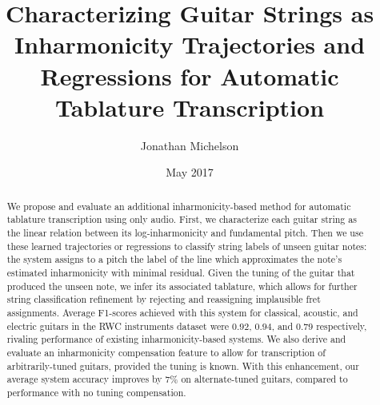\documentclass[12pt]{cmuthesis}
\begin{document}
 
\frontmatter

\pagestyle{empty}

\title{ %
{\bf Characterizing Guitar Strings as Inharmonicity Trajectories and Regressions for Automatic Tablature Transcription}}
\author{Jonathan Michelson}
\date{May 2017}
\trnumber{}


\support{}
\disclaimer{}



\maketitle


\pagestyle{plain} %


\begin{abstract}
We propose and evaluate an additional inharmonicity-based method for automatic tablature transcription using only audio. First, we characterize each guitar string as the linear relation between its log-inharmonicity and fundamental pitch. Then we use these learned trajectories or regressions to classify string labels of unseen guitar notes: the system assigns to a pitch the label of the line which approximates the note's estimated inharmonicity with minimal residual. Given the tuning of the guitar that produced the unseen note, we infer its associated tablature, which allows for further string classification refinement by rejecting and reassigning implausible fret assignments. Average F1-scores achieved with this system for classical, acoustic, and electric guitars in the RWC instruments dataset were $0.92$, $0.94$, and $0.79$ respectively, rivaling performance of existing inharmonicity-based systems. We also derive and evaluate an inharmonicity compensation feature to allow for transcription of arbitrarily-tuned guitars, provided the tuning is known. With this enhancement, our average system accuracy improves by $7\%$ on alternate-tuned guitars, compared to performance with no tuning compensation.

\end{abstract}
\end{document}
